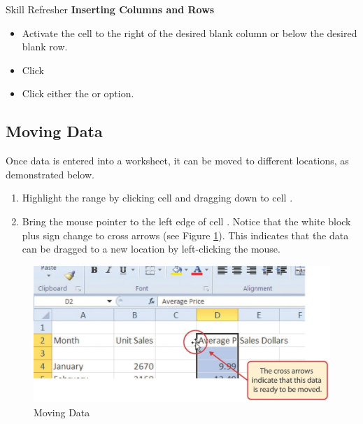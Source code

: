 \begin{center}
	\begin{sklbox}{Skill Refresher}
		\textbf{Inserting Columns and Rows}
		\\
		\begin{itemize}
			\setlength{\itemsep}{0pt}
			\setlength{\parskip}{0pt}
			\setlength{\parsep}{0pt}
			
			\item Activate the cell to the right of the desired blank column or below the desired blank row.
			\item Click 
			\item Click either the  or  option.
			
		\end{itemize}
	\end{sklbox}
\end{center}

\subsection{Moving Data}

Once data is entered into a worksheet, it can be moved to different locations, as demonstrated below.

\begin{enumerate}
	\item Highlight the range  by clicking cell  and dragging down to cell .
	\item Bring the mouse pointer to the left edge of cell . Notice that the white block plus sign change to cross arrows (see Figure \ref{01:fig30}). This indicates that the data can be dragged to a new location by left-clicking the mouse.
\end{enumerate}

\begin{figure}[H]
	\centering
	\includegraphics[width=\maxwidth{.95\linewidth}]{gfx/ch01_fig30}
	\caption{Moving Data}
	\label{01:fig30}
\end{figure}


